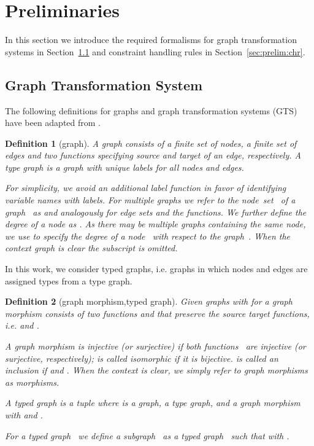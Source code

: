 \documentclass{tlp}
\newtheorem{definition}{Definition}[section]
\begin{document}
\section{Preliminaries}
\label{sec:preliminaries}

In this section we introduce the required formalisms for graph transformation
systems in Section~\ref{sec:prelim:gts} and constraint handling rules in
Section~\ref{sec:prelim:chr}.

\subsection{Graph Transformation System}
\label{sec:prelim:gts}

The following definitions for graphs and graph transformation systems (GTS) have
been adapted from \cite{ehrigprangetaentzer06}.

\begin{definition}[graph] A \emph{graph}  consists of a finite set  of nodes, a finite set  of edges and two
functions  specifying source and target of an edge,
respectively. A \emph{type graph}  is a graph with unique labels for all
nodes and edges.

For simplicity, we avoid an additional label function in favor of identifying
variable names with labels. For multiple graphs we refer to the node~set~ of a
graph~ as  and analogously for edge sets and the  functions.
We further define the degree of a node as . As
there may be multiple graphs containing the same node, we use  to
specify the degree of a node~ with respect to the graph~. When the context
graph is clear the subscript is omitted.
\end{definition}

In this work, we consider typed graphs, i.e. graphs in which nodes and edges are
assigned types from a type graph.

\begin{definition}[graph morphism,typed graph] 
Given graphs  with  for  a
\emph{graph morphism}  consists of two
functions  and  that
preserve the source target functions, i.e.  and .

A graph morphism  is \emph{injective} (or \emph{surjective}) if both
functions~ are injective (or surjective, respectively);  is called
\emph{isomorphic} if it is bijective.  is called an \emph{inclusion} if
 and . When the context is
clear, we simply refer to graph morphisms as morphisms.

A \emph{typed graph}  is a tuple  where  is a graph,  a type graph, and  a graph morphism with
 and .

For a typed graph~ we define a
\emph{subgraph}~ as a typed graph~ such that
 with .
\end{definition}
\end{document}
